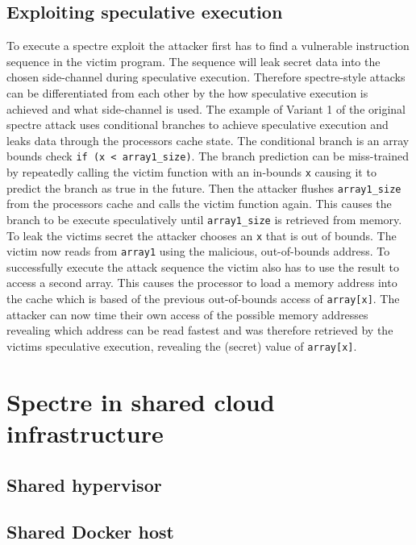 \documentclass[conference,compsoc,final,a4paper]{IEEEtran}
\begin{document}
\subsection{Exploiting speculative execution}
To execute a spectre exploit the attacker first has to find a vulnerable instruction sequence in the victim program. The sequence will leak secret data into the chosen
side-channel during speculative execution. Therefore spectre-style attacks can be differentiated from each other by the how speculative execution is achieved
and what side-channel is used. \cite{kocher2018spectre} The example of Variant 1 of the original spectre attack uses conditional branches to achieve speculative
execution and leaks data through the processors cache state. The conditional branch is an array bounds check \lstinline|if (x < array1_size)|. The branch prediction
can be miss-trained by repeatedly calling the victim function with an in-bounds \lstinline|x| causing it to predict the branch as true in the future. Then the
attacker flushes \lstinline|array1_size| from the processors cache and calls the victim function again. This causes the branch to be execute speculatively
until \lstinline|array1_size| is retrieved from memory. To leak the victims secret the attacker chooses an \lstinline|x| that is out of bounds. The victim
now reads from \lstinline|array1| using the malicious, out-of-bounds address. To successfully execute the attack sequence the victim also has to use the result to
access a second array. This causes the processor to load a memory address into the cache which is based of the previous out-of-bounds access of \lstinline|array[x]|.
The attacker can now time their own access of the possible memory addresses revealing which address can be read fastest and was therefore retrieved by the victims
speculative execution, revealing the (secret) value of \lstinline|array[x]|.
\section{Spectre in shared cloud infrastructure}

\subsection{Shared hypervisor}

\subsection{Shared Docker host}
\end{document}
